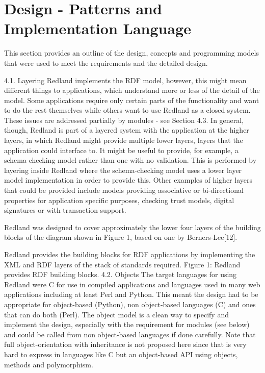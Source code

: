 \documentclass[11pt]{article}
\begin{document}
    \section{Design - Patterns and Implementation Language}
    This section provides an outline of the design, concepts and programming models that were used to meet the requirements and the detailed design.

    4.1. Layering
    Redland implements the RDF model, however, this might mean different things to applications, which understand more or less of the detail of the model. Some applications require only certain parts of the functionality and want to do the rest themselves while others want to use Redland as a closed system. These issues are addressed partially by modules - see Section 4.3. In general, though, Redland is part of a layered system with the application at the higher layers, in which Redland might provide multiple lower layers, layers that the application could interface to. It might be useful to provide, for example, a schema-checking model rather than one with no validation. This is performed by layering inside Redland where the schema-checking model uses a lower layer model implementation in order to provide this. Other examples of higher layers that could be provided include models providing associative or bi-directional properties for application specific purposes, checking trust models, digital signatures or with transaction support.

    Redland was designed to cover approximately the lower four layers of the building blocks of the diagram shown in Figure 1, based on one by Berners-Lee[12].

    Redland provides the building blocks for RDF applications by implementing the XML and RDF layers of the stack of standards required.
    Figure 1: Redland provides RDF building blocks.
    4.2. Objects
    The target languages for using Redland were C for use in compiled applications and languages used in many web applications including at least Perl and Python. This meant the design had to be appropriate for object-based (Python), non object-based languages (C) and ones that can do both (Perl). The object model is a clean way to specify and implement the design, especially with the requirement for modules (see below) and could be called from non object-based languages if done carefully. Note that full object-orientation with inheritance is not proposed here since that is very hard to express in languages like C but an object-based API using objects, methods and polymorphism.
\end{document}
